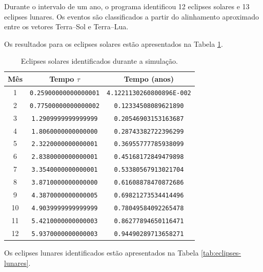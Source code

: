 \documentclass[12pt,a4paper]{article}
\begin{document}
Durante o intervalo de um ano, o programa identificou 12 eclipses solares e 13 eclipses lunares. Os eventos são classificados a partir do alinhamento aproximado entre os vetores Terra--Sol e Terra--Lua.

Os resultados para os eclipses solares estão apresentados na Tabela \ref{tab:eclipses-solares}.

\begin{table}[htbp]
    \centering
    \caption{Eclipses solares identificados durante a simulação.}
    \label{tab:eclipses-solares}
    \scriptsize
    \begin{tabular}{c c c}
        \hline
        Mês & Tempo $\tau$ & Tempo (anos) \\
        \hline
        1 & \texttt{0.25900000000000001} & \texttt{4.1221130260800896E-002} \\
        2 & \texttt{0.77500000000000002} & \texttt{0.12334508089621890} \\
        3 & \texttt{1.2909999999999999} & \texttt{0.20546903153163687} \\
        4 & \texttt{1.8060000000000000} & \texttt{0.28743382722396299} \\
        5 & \texttt{2.3220000000000001} & \texttt{0.36955777785938099} \\
        6 & \texttt{2.8380000000000001} & \texttt{0.45168172849479898} \\
        7 & \texttt{3.3540000000000001} & \texttt{0.53380567913021704} \\
        8 & \texttt{3.8710000000000000} & \texttt{0.61608878470872686} \\
        9 & \texttt{4.3870000000000005} & \texttt{0.69821273534414496} \\
        10 & \texttt{4.9039999999999999} & \texttt{0.78049584092265478} \\
        11 & \texttt{5.4210000000000003} & \texttt{0.86277894650116471} \\
        12 & \texttt{5.9370000000000003} & \texttt{0.94490289713658271} \\
        \hline
    \end{tabular}
\end{table}

Os eclipses lunares identificados estão apresentados na Tabela \ref{tab:eclipses-lunares}.
\end{document}
